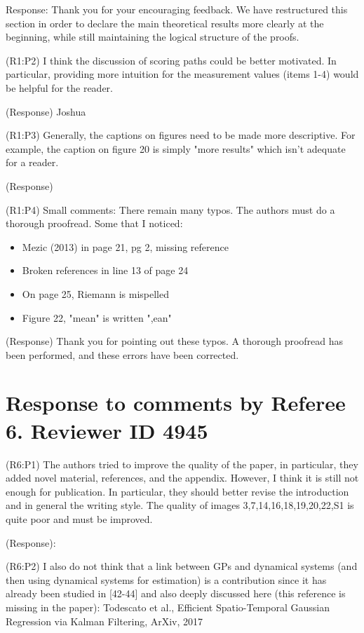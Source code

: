 \documentclass{letter}
\begin{document}
{\color{red} Response:} Thank you for your encouraging feedback. We have restructured this section in order to declare the main theoretical results more clearly at the beginning, while still maintaining the logical structure of the proofs.


{\color{red}(R1:P2)} I think the discussion of scoring paths could be better motivated. In particular, providing more intuition for the measurement values (items 1-4) would be helpful for the reader. 

{\color{red}(Response)} Joshua

{\color{red}(R1:P3)} Generally, the captions on figures need to be made more descriptive. For example, the caption on figure 20 is simply "more results" which isn't adequate for a reader. 

{\color{red}(Response)} 

{\color{red}(R1:P4)} Small comments: There remain many typos. The authors must do a thorough proofread. Some that I noticed:
\begin{itemize}
	\item Mezic (2013) in page 21, pg 2, missing reference 
	\item Broken references in line 13 of page 24
	\item On page 25, Riemann is mispelled
	\item Figure 22, "mean" is written ",ean"
\end{itemize}

{\color{red}(Response)} Thank you for pointing out these typos. A thorough proofread has been performed, and these errors have been corrected.



\section{Response to comments by Referee 6. Reviewer ID 4945}

{\color{red}(R6:P1)} The authors tried to improve the quality of the paper, in particular, they added novel material, references, and the appendix. However, I think it is still not enough for publication. In particular, they should better revise the introduction and in general the writing style. The quality of images 3,7,14,16,18,19,20,22,S1 is quite poor and must be improved. 

{\color{red}(Response)}: 


{\color{red}(R6:P2)} I also do not think that a link between GPs and dynamical systems (and then using dynamical systems for estimation) is a contribution since it has already been studied in [42-44] and also deeply discussed here (this reference is missing in the paper): Todescato et al., Efficient Spatio-Temporal Gaussian Regression via Kalman Filtering, ArXiv, 2017
\end{document}
